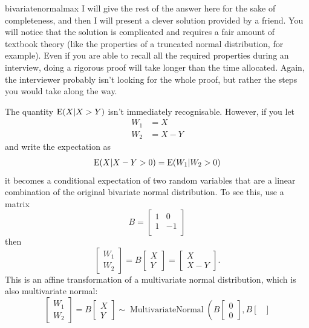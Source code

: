 \begin{answer}{bivariatenormalmax}
I will give the rest of the answer here for the sake of completeness, and then I will present a clever solution provided by a friend.
You will notice that the solution is complicated and requires a fair amount of textbook theory (like the properties of a truncated normal distribution, for example).
Even if you are able to recall all the required properties during an interview, doing a rigorous proof will take longer than the time allocated.
Again, the interviewer probably isn't looking for the whole proof, but rather the steps you would take along the way.

The quantity $\operatorname{\mathrm{E}}(X|X > Y)$ isn't immediately recognisable.
However, if you let
\begin{align*}
W_1 &= X \\
W_2 &= X-Y
\end{align*}
and write the expectation as
\begin{align*}
\operatorname{\mathrm{E}}(X|X-Y > 0) = \operatorname{\mathrm{E}}(W_1|W_2 > 0)
\end{align*}
it becomes a conditional expectation of two random variables that are a linear combination of the original bivariate normal distribution.
To see this, use a matrix
\[B =
\begin{bmatrix}
  1   &  0 \\
  1   & -1 \\
  \end{bmatrix}
\]
then
\[
\begin{bmatrix}
  W_1 \\ W_2
\end{bmatrix}
=
B
  \begin{bmatrix}
  X \\ Y
  \end{bmatrix}
  =
  \begin{bmatrix}
  X \\ X-Y
  \end{bmatrix}
  \text{.}
\]
This is an affine transformation of a multivariate normal distribution, which is also multivariate normal:
\[
\begin{bmatrix}
  W_1 \\ W_2
\end{bmatrix}
=
B
\begin{bmatrix}
X \\ Y
\end{bmatrix}
\sim
\operatorname{MultivariateNormal}
\left(
B
\begin{bmatrix}
0 \\ 0
\end{bmatrix}
  ,
  B
  \begin{bmatrix}

\end{bmatrix}\]
\end{answer}
